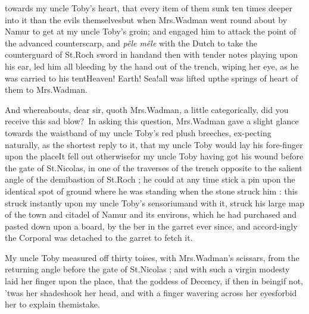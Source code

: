 \documentclass{article}
\begin{document}
\noindent
{}
\break 
{}
towards my uncle Toby’s heart, that every item of them
sunk ten times deeper into it than the evils themselves\tsh but
when Mrs.\@ Wadman went round about by Namur to get at
my uncle Toby’s groin; and engaged him to attack the
point of the advanced counterscarp, and \textit{pêle mêle}\pb
with the Dutch to take the counterguard of St.\@ Roch
sword in hand\tsk and then with tender notes playing upon his
ear, led him all bleeding by the hand out of the trench, wiping her
eye, as he was carried to his tent\tsh Heaven! Earth!
Sea!\tsk all was lifted up\tsk the springs of\break
{}
\break
heart of them to Mrs.\@ Wadman.

\tsk And whereabouts, dear sir, quoth Mrs.\@ Wadman, a
little categorically, did you receive this sad
blow?\tsk\ In asking this question, Mrs.\@ Wadman gave
a slight glance towards the waistband of my uncle
Toby’s red plush breeches, ex-\pb pecting naturally, as the
shortest reply to it, that my uncle Toby would lay his
fore-finger upon the place\tsh It fell out
otherwise\tsh for my uncle Toby having got his wound before the gate of St.\@ Nicolas,
in one of the traverses of the trench opposite to the salient angle
of the demibastion of St.\@ Roch ; he could at any time stick a
pin upon the identical spot of ground where he was standing when
the stone struck him : this struck instantly upon my uncle
Toby’s sensorium\tsh and with it, struck his
large map of the town and citadel of Namur and its environs,
which he had purchased and pasted down upon a board, by the\break
{}
ber in the garret ever since, and accord-\pb ingly the Corporal was detached to the garret to fetch
it.

My uncle Toby measured off thirty toises, with 
Mrs.\@ Wadman’s scissars, from the returning angle before the
gate of St.\@ Nicolas ; and with such a virgin modesty laid her
finger upon the place, that the goddess of Decency, if then in
being\tsk if not, ’twas her shade\tsk shook her head, and
with a finger wavering across her eyes\tsk forbid her to explain
the\break mistake.
\end{document}
